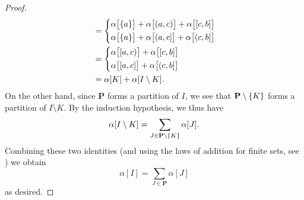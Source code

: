 \begin{proof}
\begin{align*}
                           & = \begin{dcases}
                                 \alpha\big[\set{a}\big] + \alpha\big[(a, c)\big] + \alpha\big[[c, b]\big] \\
                                 \alpha\big[\set{a}\big] + \alpha\big[(a, c]\big] + \alpha\big[(c, b]\big]
                               \end{dcases} \\
                           & = \begin{dcases}
                                 \alpha\big[[a, c)\big] + \alpha\big[[c, b]\big] \\
                                   \alpha\big[[a, c]\big] + \alpha\big[(c, b]\big]
                               \end{dcases}                                         \\
                           & = \alpha[K] + \alpha[I \setminus K].
  \end{align*}
  On the other hand, since \(\mathbf{P}\) forms a partition of \(I\), we see that \(\mathbf{P} \setminus \left\lbrace K\right\rbrace\) forms a partition of \(I \setminus K\).
  By the induction hypothesis, we thus have
  \[
    \alpha[I \setminus K] = \sum_{J \in \mathbf{P} \setminus \left\lbrace K\right\rbrace} \alpha[J].
  \]
  Combining these two identities (and using the laws of addition for finite sets, see ) we obtain
  \[
    \alpha[I] = \sum_{J \in \mathbf{P}} \alpha[J]
  \]
  as desired.


\end{proof}
